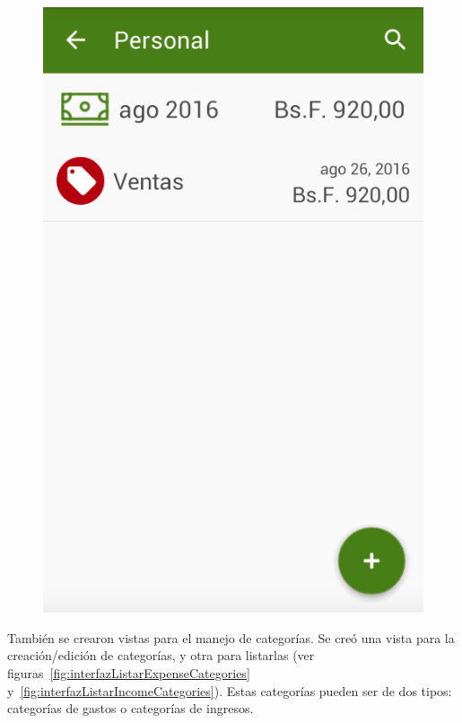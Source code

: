\begin{figure}[ht]
\begin{minipage}{.5\textwidth}
\end{minipage}%
\begin{minipage}{.5\textwidth}
\centering
  \includegraphics[scale=0.4,type=png,ext=.png,read=.png]{imagenes/incomes_list}
  \captionsetup{justification=centering}
  \label{fig:interfazListarIncomes}
\end{minipage}
\end{figure}

También se crearon vistas para el manejo de categorías. Se creó una vista para la creación/edición de categorías, y otra para listarlas (ver figuras~\ref{fig:interfazListarExpenseCategories} y~\ref{fig:interfazListarIncomeCategories}). Estas categorías pueden ser de dos tipos: categorías de gastos o categorías de ingresos.

